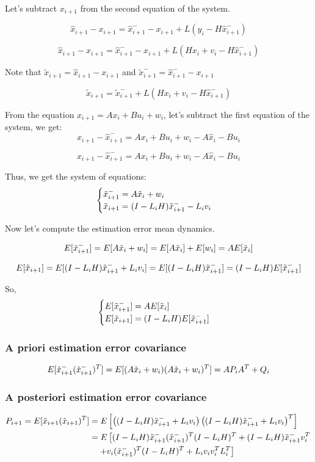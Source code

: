 Let's subtract \(x_{i+1}\) from the second equation of the system.

\[
\hat{x}_{i+1} - x_{i+1} = \hat{x}_{i+1}^- - x_{i+1} + L(y_i - H \hat{x}_{i+1}^-)
\]

\[
\hat{x}_{i+1} - x_{i+1} = \hat{x}_{i+1}^- - x_{i+1} + L(Hx_i + v_i - H \hat{x}_{i+1}^-)
\]

Note that \(\tilde{x}_{i+1} = \hat{x}_{i+1} - x_{i+1}\) and \(\tilde{x}_{i+1}^- = \hat{x}_{i+1}^- - x_{i+1}\)

\[
\tilde{x}_{i+1} = \tilde{x}_{i+1}^- + L(Hx_i + v_i - H \hat{x}_{i+1}^-)
\]


From the equation \(x_{i+1} = A x_i + B u_i + w_i\), let's subtract the first equation of the system, we get: 
\[ x_{i+1} - \hat x_{i+1}^- = A x_i + Bu_i + w_i  - A \hat x_i - Bu_i\]

\[ x_{i+1} - \hat x_{i+1}^- = A x_i + Bu_i + w_i - A \hat x_i - Bu_i\]


Thus, we get the system of equations:
\[
\begin{cases}
    \Tilde x_{i+1}^- = A \Tilde x_i + w_i\\
    \Tilde x_{i+1} = (I - L_i H)\Tilde x_{i+1}^- - L_i v_i
\end{cases}
\]



Now let's compute the estimation error mean dynamics. 

\[
E[\Tilde{x}_{i+1}^-] = E[A \Tilde{x}_i + w_i] = E[A \Tilde{x}_i] + E[w_i] = AE[\Tilde{x}_i]
\]

\[
E[\Tilde{x}_{i+1}] = E[(I - L_i H)\Tilde{x}_{i+1}^- + L_i v_i] = E[(I - L_i H)\Tilde{x}_{i+1}^-] = (I - L_i H)E[\Tilde{x}_{i+1}^-]
\]

So, 
\[
\begin{cases}
    E[\Tilde{x}_{i+1}^-] = AE[\Tilde{x}_i] \\
    E[\Tilde{x}_{i+1}] = (I - L_i H)E[\Tilde{x}_{i+1}^-] 
\end{cases}
\]

\subsubsection{A priori estimation error covariance}

\[
E[\Tilde{x}_{i+1}^- (\Tilde{x}_{i+1}^-)^T] = E[(A \Tilde{x}_i + w_i)(A \Tilde{x}_i + w_i)^T] = AP_iA^T + Q_i
\]

\subsubsection{A posteriori estimation error covariance}
\[
\begin{aligned}
P_{i+1} = E[\Tilde{x}_{i+1} (\Tilde{x}_{i+1})^T] &= E\left[ \left( (I-L_i H) \Tilde{x}_{i+1}^- + L_i v_i \right) \left( (I-L_i H) \Tilde{x}_{i+1}^- + L_i v_i \right)^T \right] \\
&= E\left[ (I-L_i H) \Tilde{x}_{i+1}^- (\Tilde{x}_{i+1}^-)^T (I -L_i H)^T + (I- L_i H) \Tilde{x}_{i+1}^- v_i^T \right. \\
& \quad \left. + v_i (\Tilde{x}_{i+1}^-)^T (I-L_i H)^T + L_i v_i v_i^T L_i^T \right]
\end{aligned}
\]

